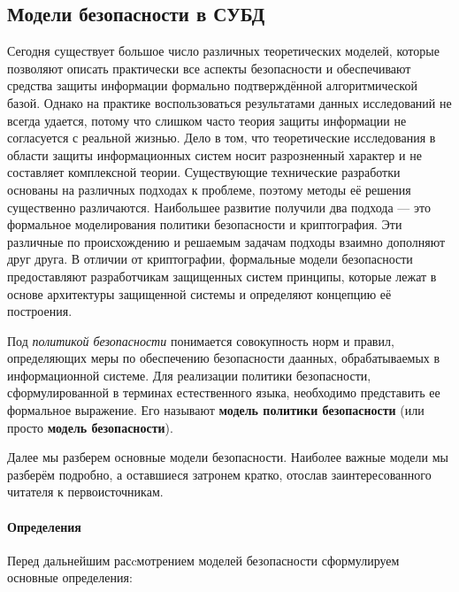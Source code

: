 \subsection{Модели безопасности в СУБД}

Сегодня существует большое число различных теоретических моделей, которые позволяют описать практически все аспекты безопасности и обеспечивают средства защиты информации формально подтверждённой алгоритмической базой. Однако на практике воспользоваться результатами данных исследований не всегда удается, потому что слишком часто теория защиты информации не согласуется с реальной жизнью. Дело в том, что теоретические исследования в области защиты информационных систем носит разрозненный характер и не составляет комплексной теории. Существующие технические разработки основаны на различных подходах к проблеме, поэтому методы её решения существенно различаются. Наибольшее развитие получили два подхода --- это формальное моделирования политики безопасности и криптография. Эти различные по происхождению и решаемым задачам подходы взаимно дополняют друг друга. В отличии от криптографии, формальные модели безопасности предоставляют разработчикам защищенных систем принципы, которые лежат в основе архитектуры защищенной системы и определяют концепцию её построения.

Под \textit{политикой безопасности} понимается совокупность норм и правил, определяющих меры по обеспечению безопасности даанных, обрабатываемых в информационной системе.  Для реализации политики безопасности, сформулированной в терминах естест­венного языка, необходимо представить ее формальное выражение.  Его называют \textbf{модель политики безопасности} (или просто \textbf{модель безопасности}).

Далее мы разберем основные модели безопасности. Наиболее важные модели мы разберём подробно, а оставшиеся затронем кратко,  отослав заинтересованного читателя к первоисточникам.

\paragraph{Определения}

Перед дальнейшим расcмотрением моделей безопасности сформулируем основные определения:

